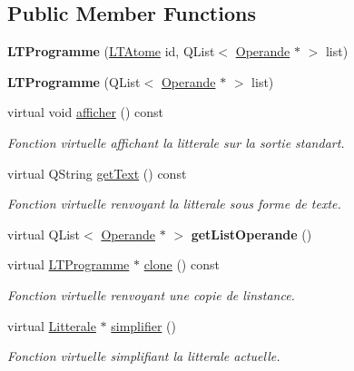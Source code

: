 \subsection*{Public Member Functions}
\begin{DoxyCompactItemize}
\item 
{\bfseries L\+T\+Programme} (\hyperlink{class_l_t_atome}{L\+T\+Atome} id, Q\+List$<$ \hyperlink{class_operande}{Operande} $\ast$ $>$ list)\hypertarget{class_l_t_programme_a3a7dcba1419be15c4ca428c3b63423c9}{}\label{class_l_t_programme_a3a7dcba1419be15c4ca428c3b63423c9}

\item 
{\bfseries L\+T\+Programme} (Q\+List$<$ \hyperlink{class_operande}{Operande} $\ast$ $>$ list)\hypertarget{class_l_t_programme_a6bcc09bf64964e759b2ec3c0553ea97f}{}\label{class_l_t_programme_a6bcc09bf64964e759b2ec3c0553ea97f}

\item 
virtual void \hyperlink{class_l_t_programme_a245492a9909248573dfab29fe4f7b4ef}{afficher} () const \hypertarget{class_l_t_programme_a245492a9909248573dfab29fe4f7b4ef}{}\label{class_l_t_programme_a245492a9909248573dfab29fe4f7b4ef}

\begin{DoxyCompactList}\small\item\em Fonction virtuelle affichant la litterale sur la sortie standart. \end{DoxyCompactList}\item 
virtual Q\+String \hyperlink{class_l_t_programme_ad5f8e3d531b8a456944d806096881022}{get\+Text} () const 
\begin{DoxyCompactList}\small\item\em Fonction virtuelle renvoyant la litterale sous forme de texte. \end{DoxyCompactList}\item 
virtual Q\+List$<$ \hyperlink{class_operande}{Operande} $\ast$ $>$ {\bfseries get\+List\+Operande} ()\hypertarget{class_l_t_programme_aa2d0b7cd9ab8fde8107aecf4731ca1f4}{}\label{class_l_t_programme_aa2d0b7cd9ab8fde8107aecf4731ca1f4}

\item 
virtual \hyperlink{class_l_t_programme}{L\+T\+Programme} $\ast$ \hyperlink{class_l_t_programme_a1ae271a87f8b770aec069aa6dec3b84b}{clone} () const 
\begin{DoxyCompactList}\small\item\em Fonction virtuelle renvoyant une copie de l\textquotesingle{}instance. \end{DoxyCompactList}\item 
virtual \hyperlink{class_litterale}{Litterale} $\ast$ \hyperlink{class_l_t_programme_a7bfe6b6140e56fc578ed5dce2e2d9ea5}{simplifier} ()
\begin{DoxyCompactList}\small\item\em Fonction virtuelle simplifiant la litterale actuelle. \end{DoxyCompactList}\end{DoxyCompactItemize}


